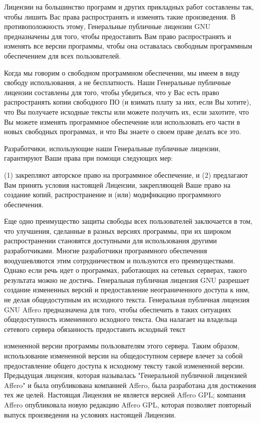 Лицензии на большинство программ и других прикладных работ составлены так, чтобы лишить Вас права распространять и изменять такие произведения. В противоположность этому, Генеральные публичные лицензии GNU предназначены для того, чтобы предоставить Вам право распространять и изменять все версии программы, чтобы она оставалась свободным программным обеспечением для всех пользователей.

Когда мы говорим о свободном программном обеспечении, мы имеем в виду свободу использования, а не бесплатность. Наши Генеральные публичные лицензии составлены для того, чтобы убедиться, что у Вас есть право распространять копии свободного ПО (и взимать плату за них, если Вы хотите), что Вы получаете исходные тексты или можете получить их, если захотите, что Вы можете изменять программное обеспечение или использовать его части в новых свободных программах, и что Вы знаете о своем праве делать все это.

Разработчики, использующие наши Генеральные публичные лицензии, гарантируют Ваши права при помощи следующих мер\+:

(1) закрепляют авторское право на программное обеспечение, и (2) предлагают Вам принять условия настоящей Лицензии, закрепляющей Ваше право на создание копий, распространение и (или) модификацию программного обеспечения.

Еще одно преимущество защиты свободы всех пользователей заключается в том, что улучшения, сделанные в разных версиях программы, при их широком распространении становятся доступными для использования другими разработчиками. Многие разработчики программного обеспечения воодушевляются этим сотрудничеством и пользуются его преимуществами. Однако если речь идет о программах, работающих на сетевых серверах, такого результата можно не достичь. Генеральная публичная лицензия GNU разрешает создание измененных версий и предоставление неограниченного доступа к ним, не делая общедоступным их исходного текста. Генеральная публичная лицензия GNU Affero предназначена для того, чтобы обеспечить в таких ситуациях общедоступность измененного исходного текста. Она налагает на владельца сетевого сервера обязанность предоставить исходный текст

измененной версии программы пользователям этого сервера. Таким образом, использование измененной версии на общедоступном сервере влечет за собой предоставление общего доступа к исходному тексту такой измененной версии. Предыдущая лицензия, которая называлась "{}Генеральной публичной лицензией Affero"{} и была опубликована компанией Affero, была разработана для достижения тех же целей. Настоящая Лицензия не является версией Affero GPL; компания Affero опубликовала новую редакцию Affero GPL, которая позволяет повторный выпуск произведения на условиях настоящей Лицензии.


